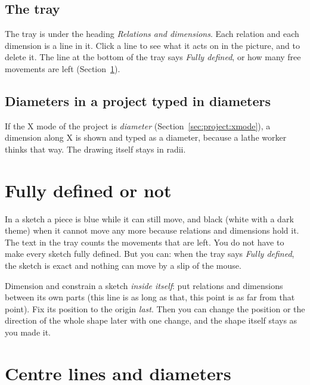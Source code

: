
\subsection{The tray}\label{sec:sketch:tray}
The tray is under the heading \emph{Relations and dimensions}. Each relation and each dimension is a line in it. Click a line to see what it acts on in the picture, and  to delete it. The line at the bottom of the tray says \emph{Fully defined}, or how many free movements are left (Section~\ref{sec:sketch:defined}).

\subsection{Diameters in a project typed in diameters}
If the X mode of the project is \emph{diameter} (Section~\ref{sec:project:xmode}), a dimension along X is shown and typed as a diameter, because a lathe worker thinks that way. The drawing itself stays in radii.

\section{Fully defined or not}\label{sec:sketch:defined}

In a sketch a piece is \textcolor{blue!60!black}{blue} while it can still move, and black (white with a dark theme) when it cannot move any more because relations and dimensions hold it. The text in the tray counts the movements that are left. You do not have to make every sketch fully defined. But you can: when the tray says \emph{Fully defined}, the sketch is exact and nothing can move by a slip of the mouse.

\begin{tipbox}
Dimension and constrain a sketch \emph{inside itself}: put relations and dimensions between its own parts (this line is as long as that, this point is as far from that point). Fix its position to the origin \emph{last}. Then you can change the position or the direction of the whole shape later with one change, and the shape itself stays as you made it.
\end{tipbox}

\section{Centre lines and diameters}\label{sec:sketch:centre}

